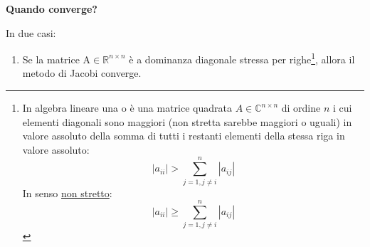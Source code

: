 \begin{flushleft}
    \textcolor{Green3}{ \textbf{Quando converge?}}
\end{flushleft}
In due casi:
\begin{enumerate}
    \item Se la matrice $\mathrm{A} \in \mathbb{R}^{n \times n}$ è a dominanza diagonale stressa per righe\footnote{\label{dominanza diagonale stressa per righe}
        In algebra lineare una  o  è una matrice quadrata $A \in \mathbb{C}^{n \times n}$ di ordine $n$ i cui elementi diagonali sono maggiori (non stretta sarebbe maggiori o uguali) in valore assoluto della somma di tutti i restanti elementi della stessa riga in valore assoluto:
        \begin{equation}
            \left| a_{ii} \right| > \displaystyle\sum_{j=1, j \ne i}^{n} \left| a_{ij} \right| 
        \end{equation}
        In senso \underline{non stretto}:
        \begin{equation}
            \left| a_{ii} \right| \ge \displaystyle\sum_{j=1, j \ne i}^{n} \left| a_{ij} \right|
        \end{equation}
    }, allora il metodo di Jacobi converge.


\end{enumerate}
